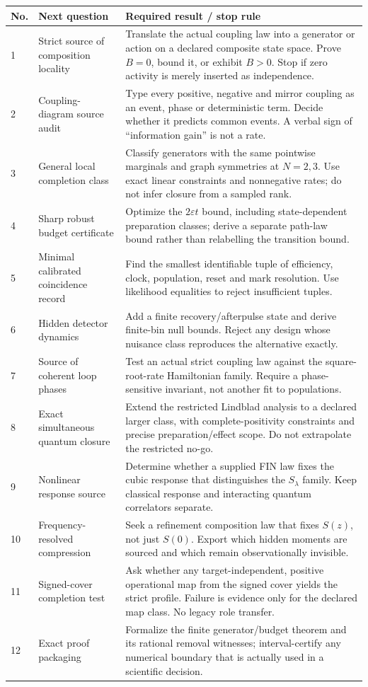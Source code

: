 \documentclass[11pt,a4paper]{article}
\begin{document}
\begin{longtable}{@{}p{}p{}p{}@{}}
\toprule No. & Next question & Required result / stop rule\\\midrule\endhead
1 & Strict source of composition locality & Translate the actual coupling
law into a generator or action on a declared composite state space. Prove
$B=0$, bound it, or exhibit $B>0$. Stop if zero activity is merely inserted
as independence.\\[2mm]
2 & Coupling-diagram source audit & Type every positive, negative and mirror
coupling as an event, phase or deterministic term. Decide whether it
predicts common events. A verbal sign of ``information gain'' is not a rate.\\[2mm]
3 & General local completion class & Classify generators with the same
pointwise marginals and graph symmetries at $N=2,3$. Use exact linear
constraints and nonnegative rates; do not infer closure from a sampled rank.\\[2mm]
4 & Sharp robust budget certificate & Optimize the $2\varepsilon t$ bound,
including state-dependent preparation classes; derive a separate path-law
bound rather than relabelling the transition bound.\\[2mm]
5 & Minimal calibrated coincidence record & Find the smallest identifiable
tuple of efficiency, clock, population, reset and mark resolution. Use
likelihood equalities to reject insufficient tuples.\\[2mm]
6 & Hidden detector dynamics & Add a finite recovery/afterpulse state and
derive finite-bin null bounds. Reject any design whose nuisance class
reproduces the alternative exactly.\\[2mm]
7 & Source of coherent loop phases & Test an actual strict coupling law
against the square-root-rate Hamiltonian family. Require a phase-sensitive
invariant, not another fit to populations.\\[2mm]
8 & Exact simultaneous quantum closure & Extend the restricted Lindblad
analysis to a declared larger class, with complete-positivity constraints
and precise preparation/effect scope. Do not extrapolate the restricted no-go.\\[2mm]
9 & Nonlinear response source & Determine whether a supplied FIN law fixes
the cubic response that distinguishes the $S_\lambda$ family. Keep
classical response and interacting quantum correlators separate.\\[2mm]
10 & Frequency-resolved compression & Seek a refinement composition law
that fixes $S(z)$, not just $S(0)$. Export which hidden moments are sourced
and which remain observationally invisible.\\[2mm]
11 & Signed-cover completion test & Ask whether any target-independent,
positive operational map from the signed cover yields the strict profile.
Failure is evidence only for the declared map class. No legacy role transfer.\\[2mm]
12 & Exact proof packaging & Formalize the finite generator/budget theorem
and its rational removal witnesses; interval-certify any numerical boundary
that is actually used in a scientific decision.\\
\bottomrule
\end{longtable}
\end{document}
